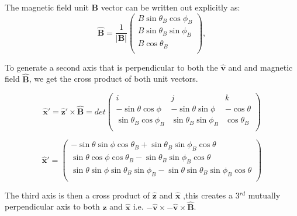 \documentclass[11pt]{article}
\begin{document}
The magnetic field unit $\mathbf{{B}}$ vector can be written out explicitly as:
\begin{equation}
   \mathbf{\hat{B}}=\frac{1}{\mathbf{|{B}|}} \left(
    \begin{array}{c}
    B\sin\theta_B \cos\phi_B \\ 	
    B\sin\theta_B \sin\phi_B \\ 
    B\cos\theta_B\\
\end{array} 
\right),  %
\end{equation}

To generate a second axis that is perpendicular to both the $\mathbf{\hat{v}}$ and and magnetic field  $\mathbf{\hat{B}}$, we get the cross product of both unit vectors.

\begin{equation}
    \mathbf{\hat{x}'} =\mathbf{\hat{z}'}\times \mathbf{\hat{B}} = det \left(
    \begin{array}{ccc}
    i & j & k \\ 	
   - \sin\theta \cos\phi & -\sin\theta \sin\phi  & -\cos\theta \\ 
     \sin\theta_B\cos\phi_B& \sin\theta_B\sin\phi_B  & \cos\theta_B\\
\end{array} 
\right)
\end{equation}

\begin{equation}
   \mathbf{\hat{x}'}=\left(
    \begin{array}{c}
   -\sin\theta\sin\phi\cos\theta_B + \sin\theta_B\sin\phi_B\cos\theta\\ 	
    \sin\theta\cos\phi\cos\theta_B - \sin\theta_B\sin\phi_B\cos\theta\\ 

    \sin\theta\sin\phi\sin\theta_B\sin\phi_B - \sin\theta\sin\theta_B\sin\phi_B\cos\theta\\
\end{array} 
\right) 
\end{equation}

The third axis is then a cross product of   $\mathbf{\hat{z}}$ and $\mathbf{\hat{x}}$ ,this creates a 3$^{rd}$ mutually perpendicular axis to both $\mathbf{\hat{z}}$ and $\mathbf{\hat{x}} $  i.e. $\mathbf{-\hat{v}} \times\mathbf{-\hat{v}}\times \mathbf{\hat{B}}$. 



\end{document}
